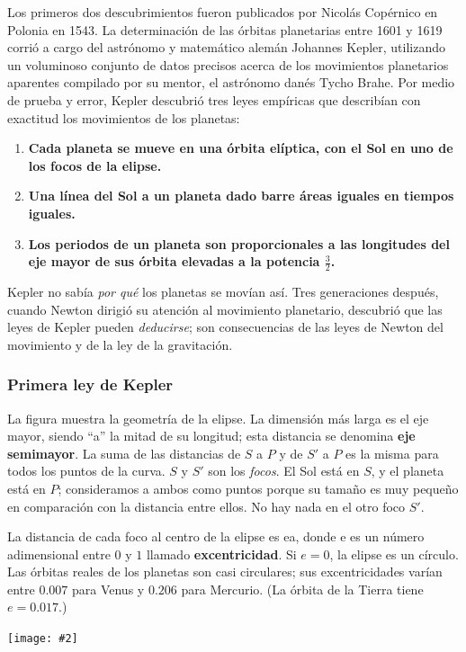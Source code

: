 \documentclass{article}
\newcommand{\newtitle}[1]{
    \color{titleColor}
    \subsubsection{#1}
    \color{black}
}
\newcommand{\bl}[1]{\textbf{#1}}
\newcommand{\definicion}[1]{%
    \vspace{0.5cm}
    \begin{definicionbox}
        #1
    \end{definicionbox}
    \vspace{0.5cm}
}
\newcommand{\ladoALado}[4]{
    \begin{minipage}[t]{#3\textwidth}
        \vspace{0pt}
        #1
    \end{minipage}
    \hfill
    \begin{minipage}[t]{#4\textwidth}
        \vspace{0pt}
        \centering
        \texttt{[image: \#2]}
    \end{minipage}
}
\begin{document}
    \par Los primeros dos descubrimientos fueron publicados por Nicolás Copérnico en Polonia en 1543. La determinación de las órbitas planetarias entre 1601 y 1619 corrió a cargo del astrónomo y matemático alemán Johannes Kepler, utilizando un voluminoso conjunto de datos precisos acerca de los movimientos planetarios aparentes compilado por su mentor, el astrónomo danés Tycho Brahe. Por medio de prueba y error, Kepler descubrió tres leyes empíricas que describían con exactitud los movimientos de los planetas:

    \definicion{
        \begin{enumerate}
            \item \bl{Cada planeta se mueve en una órbita elíptica, con el Sol en uno de los focos de la elipse.}
            \item \bl{Una línea del Sol a un planeta dado barre áreas iguales en tiempos iguales.}
            \item \bl{Los periodos de un planeta son proporcionales a las longitudes del eje mayor de sus órbita elevadas a la potencia $\frac{3}{2}$.}
        \end{enumerate}
    }

    \par Kepler no sabía \textit{por qué} los planetas se movían así. Tres generaciones después, cuando Newton dirigió su atención al movimiento planetario, descubrió que las leyes de Kepler pueden \textit{deducirse}; son consecuencias de las leyes de Newton del movimiento y de la ley de la gravitación.

    \pagebreak

    \newtitle{Primera ley de Kepler}

    \ladoALado{
        \par La ﬁgura muestra la geometría de la elipse. La dimensión más larga es el eje mayor, siendo “a” la mitad de su longitud; esta distancia se denomina \bl{eje semimayor}. La suma de las distancias de $S$ a $P$ y de $S'$ a $P$ es la misma para todos los puntos de la curva. $S$ y $S'$ son los \textit{focos}. El Sol está en $S$, y el planeta está en $P$; consideramos a ambos como puntos porque su tamaño es muy pequeño en comparación con la distancia entre ellos. No hay nada en el otro foco $S'$.

        \vspace{0.2cm}

        \par La distancia de cada foco al centro de la elipse es ea, donde e es un número adimensional entre $0$ y $1$ llamado \bl{excentricidad}. Si $e = 0$, la elipse es un círculo. Las órbitas reales de los planetas son casi circulares; sus excentricidades varían entre $0.007$ para Venus y $0.206$ para Mercurio. (La órbita de la Tierra tiene $e = 0.017$.)
    }{img/11.5-1.png}{0.6}{0.4}
\end{document}
